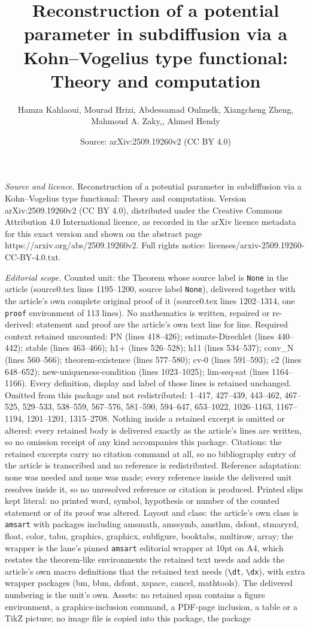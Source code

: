 \documentclass[10pt,a4paper]{amsart}
\title[Reconstruction of a potential parameter in subdiffusion via ]{Reconstruction of a potential parameter in subdiffusion via a Kohn--Vogelius type functional: Theory and computation}
\author{Hamza Kahlaoui, Mourad Hrizi, Abdessamad Oulmelk, Xiangcheng Zheng, Mahmoud A. Zaky,, Ahmed Hendy}
\date{Source: arXiv:2509.19260v2 (CC BY 4.0)}
\begin{document}
\maketitle

\noindent\emph{Source and licence.} Reconstruction of a potential parameter in subdiffusion via a Kohn--Vogelius type functional: Theory and computation. Version arXiv:2509.19260v2 (CC BY 4.0), distributed under the Creative Commons Attribution 4.0 International licence, as recorded in the arXiv licence metadata for this exact version and shown on the abstract page https://arxiv.org/abs/2509.19260v2. Full rights notice: licenses/arxiv-2509.19260-CC-BY-4.0.txt.\par\smallskip

\noindent\textit{Editorial scope.} Counted unit: the Theorem whose source label is \texttt{None} in the article (source0.tex lines 1195--1200, source label \texttt{None}), delivered together with the article's own complete original proof of it (source0.tex lines 1202--1314, one \texttt{proof} environment of 113 lines). No mathematics is written, repaired or re-derived: statement and proof are the article's own text line for line. Required context retained uncounted: PN (lines 418--426); estimate-Direchlet (lines 440--442); stable (lines 463--466); h1+ (lines 526--528); h11 (lines 534--537); conv\_N (lines 560--566); theorem-existence (lines 577--580); cv-0 (lines 591--593); c2 (lines 648--652); new-uniqueness-condition (lines 1023--1025); lim-seq-sat (lines 1164--1166). Every definition, display and label of those lines is retained unchanged. Omitted from this package and not redistributed: 1--417, 427--439, 443--462, 467--525, 529--533, 538--559, 567--576, 581--590, 594--647, 653--1022, 1026--1163, 1167--1194, 1201--1201, 1315--2708. Nothing inside a retained excerpt is omitted or altered: every retained body is delivered exactly as the article's lines are written, so no omission receipt of any kind accompanies this package. Citations: the retained excerpts carry no citation command at all, so no bibliography entry of the article is transcribed and no reference is redistributed. Reference adaptation: none was needed and none was made; every reference inside the delivered unit resolves inside it, so no unresolved reference or citation is produced. Printed slips kept literal: no printed word, symbol, hypothesis or number of the counted statement or of its proof was altered. Layout and class: the article's own class is \texttt{amsart} with packages including amsmath, amssymb, amsthm, dsfont, stmaryrd, float, color, tabu, graphics, graphicx, subfigure, booktabs, multirow, array; the wrapper is the lane's pinned \texttt{amsart} editorial wrapper at 10pt on A4, which restates the theorem-like environments the retained text needs and adds the article's own macro definitions that the retained text needs (\texttt{\textbackslash dt}, \texttt{\textbackslash dx}), with extra wrapper packages (bm, bbm, dsfont, xspace, cancel, mathtools). The delivered numbering is the unit's own. Assets: no retained span contains a figure environment, a graphics-inclusion command, a PDF-page inclusion, a table or a TikZ picture; no image file is copied into this package, the package 
\end{document}
